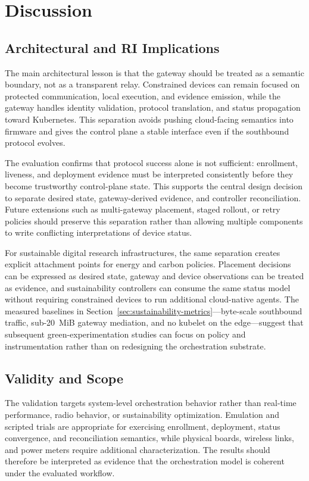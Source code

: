 \section{Discussion}\label{sec:discussion}

\subsection{Architectural and RI Implications}
The main architectural lesson is that the gateway should be treated as a semantic boundary, not as a transparent relay. Constrained devices can remain focused on protected communication, local execution, and evidence emission, while the gateway handles identity validation, protocol translation, and status propagation toward Kubernetes. This separation avoids pushing cloud-facing semantics into firmware and gives the control plane a stable interface even if the southbound protocol evolves.

The evaluation confirms that protocol success alone is not sufficient: enrollment, liveness, and deployment evidence must be interpreted consistently before they become trustworthy control-plane state. This supports the central design decision to separate desired state, gateway-derived evidence, and controller reconciliation. Future extensions such as multi-gateway placement, staged rollout, or retry policies should preserve this separation rather than allowing multiple components to write conflicting interpretations of device status.

For sustainable digital research infrastructures, the same separation creates explicit attachment points for energy and carbon policies. Placement decisions can be expressed as desired state, gateway and device observations can be treated as evidence, and sustainability controllers can consume the same status model without requiring constrained devices to run additional cloud-native agents. The measured baselines in Section~\ref{sec:sustainability-metrics}---byte-scale southbound traffic, sub-20~MiB gateway mediation, and no kubelet on the edge---suggest that subsequent green-experimentation studies can focus on policy and instrumentation rather than on redesigning the orchestration substrate.

\subsection{Validity and Scope}
The validation targets system-level orchestration behavior rather than real-time performance, radio behavior, or sustainability optimization. Emulation and scripted trials are appropriate for exercising enrollment, deployment, status convergence, and reconciliation semantics, while physical boards, wireless links, and power meters require additional characterization. The results should therefore be interpreted as evidence that the orchestration model is coherent under the evaluated workflow.

